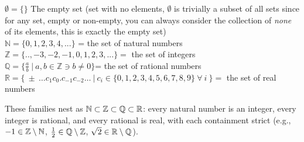 $\emptyset=\{\}$ The empty set (set with no elements, $\emptyset$ is trivially a subset of all sets since for any set, empty or non-empty, you can always consider the collection of \textit{none} of its elements, this is exactly the empty set) \index{$\emptyset$} \index{$\{\}$}\\
$\mathbb{N}=\{0, 1,2,3,4,...\}$  = the set of natural numbers\\ 
$\mathbb{Z}=\{..,-3,-2,-1,0,1,2,3,...\}=$ the set of integers\\
$\mathbb{Q}=\{\frac{a}{b} \ | \  a,b \in \mathbb{Z} \ni b\neq 0\}$= the set of rational numbers \\
$\mathbb{R}=\{\ \pm \ \dots c_1c_0.c_{-1}c_{-2}\dots \  | \ c_i\in \{0,1,2,3,4,5,6,7,8,9\} \ \forall  \ i  \ \}=$ the set of real numbers

\noindent These families nest as ${\mathbb{N}} \subset {\mathbb{Z}} \subset {\mathbb{Q}} \subset {\mathbb{R}}$: every natural number is an integer, every integer is rational, and every rational is real, with each containment strict (e.g., $-1 \in {\mathbb{Z}} \setminus {\mathbb{N}}$, $\tfrac{1}{2} \in {\mathbb{Q}} \setminus {\mathbb{Z}}$, $\sqrt{2} \in {\mathbb{R}} \setminus {\mathbb{Q}}$).

